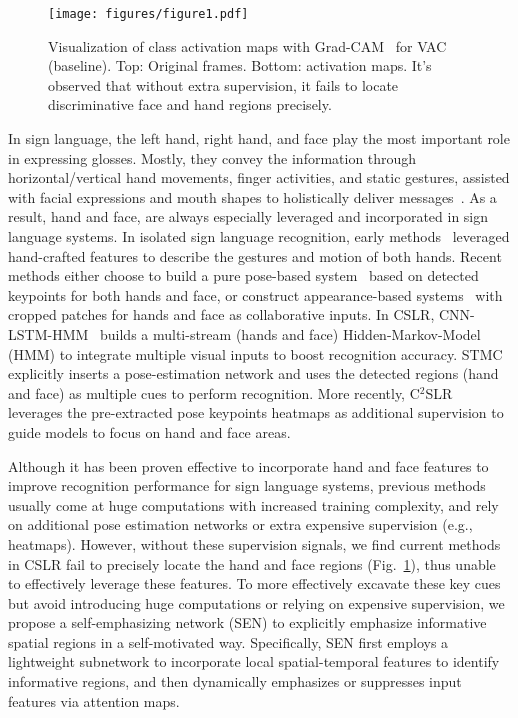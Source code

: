 \documentclass[letterpaper]{article} \usepackage{aaai23}  \usepackage{times}  \usepackage{helvet}  \usepackage{courier}  \usepackage[hyphens]{url}  \usepackage{graphicx} \urlstyle{rm} \def\UrlFont{\rm}  \usepackage{natbib}  \usepackage{caption} \frenchspacing  \setlength{\pdfpagewidth}{8.5in} \setlength{\pdfpageheight}{11in} \usepackage{algorithm}
\begin{document}
\begin{figure}[t]
    \centering
    \texttt{[image: figures/figure1.pdf]}
    \caption{Visualization of class activation maps with Grad-CAM~\cite{selvaraju2017grad} for VAC~\cite{Min_2021_ICCV} (baseline). Top: Original frames. Bottom: activation maps. It's observed that without extra supervision, it fails to locate discriminative face and hand regions precisely. }
    \label{fig1}
  \end{figure}

In sign language, the left hand, right hand, and face play the most important role in expressing glosses. Mostly, they convey the information through horizontal/vertical hand movements, finger activities, and static gestures, assisted with facial expressions and mouth shapes to holistically deliver messages~\cite{dreuw2007speech,ong2005automatic}. As a result, hand and face, are always especially leveraged and incorporated in sign language systems. In isolated sign language recognition, early methods~\cite{freeman1995orientation,sun2013discriminative} leveraged hand-crafted features to describe the gestures and motion of both hands. Recent methods either choose to build a pure pose-based system~\cite{tunga2021pose,hu2021signbert} based on detected keypoints for both hands and face, or construct appearance-based systems~\cite{hu2021hand,boukhayma20193d} with cropped patches for hands and face as collaborative inputs. In CSLR, CNN-LSTM-HMM~\cite{koller2019weakly} builds a multi-stream (hands and face) Hidden-Markov-Model (HMM) to integrate multiple visual inputs to boost recognition accuracy. STMC~\cite{zhou2020spatial} explicitly inserts a pose-estimation network and uses the detected regions (hand and face) as multiple cues to perform recognition. More recently, C$^2$SLR~\cite{zuo2022c2slr} leverages the pre-extracted pose keypoints heatmaps as additional supervision to guide models to focus on hand and face areas. 

Although it has been proven effective to incorporate hand and face features to improve recognition performance for sign language systems, previous methods usually come at huge computations with increased training complexity, and rely on additional pose estimation networks or extra expensive supervision (e.g., heatmaps). However, without these supervision signals, we find current methods~\cite{Min_2021_ICCV,hao2021self,cheng2020fully} in CSLR fail to precisely locate the hand and face regions (Fig.~\ref{fig1}), thus unable to effectively leverage these features. To more effectively excavate these key cues but avoid introducing huge computations or relying on expensive supervision, we propose a self-emphasizing network (SEN) to explicitly emphasize informative spatial regions in a self-motivated way. Specifically, SEN first employs a lightweight subnetwork to incorporate local spatial-temporal features to identify informative regions, and then dynamically emphasizes or suppresses input features via attention maps. 
\end{document}
